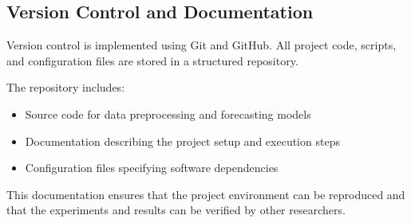 \subsection{Version Control and Documentation}

Version control is implemented using Git and GitHub. All project code, scripts, and configuration files are stored in a structured repository.

The repository includes:

\begin{itemize}
	\item Source code for data preprocessing and forecasting models
	\item Documentation describing the project setup and execution steps
	\item Configuration files specifying software dependencies
\end{itemize}

This documentation ensures that the project environment can be reproduced and that the experiments and results can be verified by other researchers.